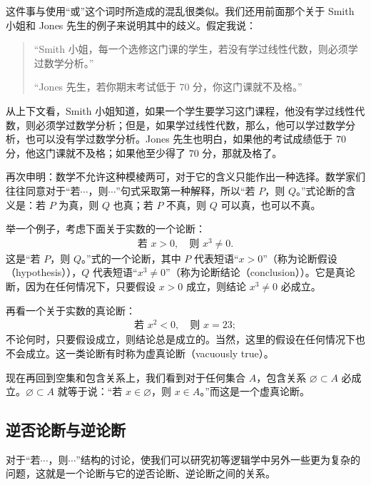 \documentclass[../../main.tex]{subfiles}
\begin{document}
这件事与使用“或”这个词时所造成的混乱很类似。我们还用前面那个关于 Smith 小姐和 Jones 先生的例子来说明其中的歧义。假定我说：

\begin{quote}
“Smith 小姐，每一个选修这门课的学生，若没有学过线性代数，则必须学过数学分析。”

“Jones 先生，若你期末考试低于 $70$ 分，你这门课就不及格。”
\end{quote}

从上下文看，Smith 小姐知道，如果一个学生要学习这门课程，他没有学过线性代数，则必须学过数学分析；但是，如果学过线性代数，那么，他可以学过数学分析，也可以没有学过数学分析。Jones 先生也明白，如果他的考试成绩低于 $70$ 分，他这门课就不及格；如果他至少得了 $70$ 分，那就及格了。

再次申明：数学不允许这种模棱两可，对于它的含义只能作出一种选择。数学家们往往同意对于“若$\cdots$，则$\cdots$”句式采取第一种解释，所以“若 $P$，则 $Q$。”式论断的含义是：若 $P$ 为真，则 $Q$ 也真；若 $P$ 不真，则 $Q$ 可以真，也可以不真。

举一个例子，考虑下面关于实数的一个论断：
\begin{align*}
\text{若 } x > 0, \quad \text{则 } x^{3} \neq 0.
\end{align*}
这是“若 $P$，则 $Q$。”式的一个论断，其中 $P$ 代表短语“$x > 0$”（称为论断假设（hypothesis）），$Q$ 代表短语“$x^{3} \neq 0$”（称为论断结论（conclusion））。它是真论断，因为在任何情况下，只要假设 $x > 0$ 成立，则结论 $x^{3} \neq 0$ 必成立。

再看一个关于实数的真论断：
\begin{align*}
\text{若 } x^{2} < 0, \quad \text{则 } x = 23;
\end{align*}
不论何时，只要假设成立，则结论总是成立的。当然，这里的假设在任何情况下也不会成立。这一类论断有时称为虚真论断（vacuously true）。

现在再回到空集和包含关系上，我们看到对于任何集合 $A$，包含关系 $\varnothing \subset A$ 必成立。$\varnothing \subset A$ 就等于说：“若 $x \in \varnothing$，则 $x \in A$。”而这是一个虚真论断。

\subsection*{逆否论断与逆论断}

对于“若$\cdots$，则$\cdots$”结构的讨论，使我们可以研究初等逻辑学中另外一些更为复杂的问题，这就是一个论断与它的逆否论断、逆论断之间的关系。
\end{document}
